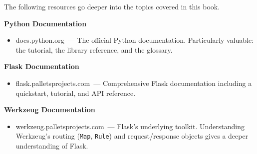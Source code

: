 \begin{codebox}
\begin{Shaded}
\begin{Highlighting}[]
   


    
\end{Highlighting}
\end{Shaded}

\end{codebox}

\label{ch:44-appendices-4}

\chapterrule

The following resources go deeper into the topics covered in this book.

\label{44-appendices:d1-python-and-flask}

\textbf{Python Documentation}

\begin{itemize}
\tightlist
\item
  docs.python.org~--- The official Python documentation. Particularly valuable: the tutorial, the library reference, and the glossary.
\end{itemize}

\noindent{}\textbf{Flask Documentation}

\begin{itemize}
\tightlist
\item
  flask.palletsprojects.com~--- Comprehensive Flask documentation including a quickstart, tutorial, and API reference.
\end{itemize}

\noindent{}\textbf{Werkzeug Documentation}

\begin{itemize}
\tightlist
\item
  werkzeug.palletsprojects.com~--- Flask's underlying toolkit. Understanding Werkzeug's routing (\texttt{Map}, \texttt{Rule}) and request/response objects gives a deeper understanding of Flask.
\end{itemize}


